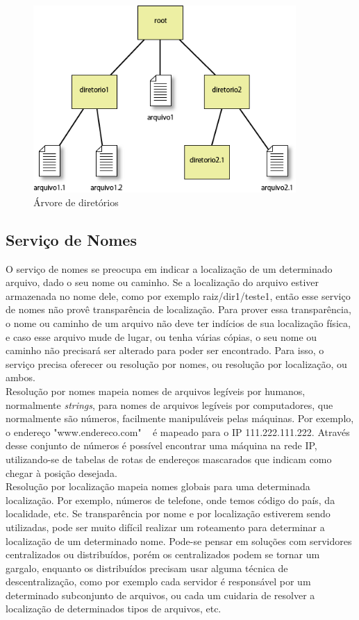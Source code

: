 	\begin{figure}[htb]
		\begin{center}
			
			\includegraphics[clip,width=10.0cm]{images/image3.png}
			\caption{Árvore de diretórios}
			\label{fig:arv_dir}
		\end{center}
	\end{figure}
	
	\subsection{Serviço de Nomes}
	O serviço de nomes se preocupa em indicar a localização de um determinado arquivo, dado o seu nome ou caminho. Se a localização do arquivo estiver armazenada no nome dele, como por exemplo raiz/dir1/teste1, então esse serviço de nomes não provê transparência de localização. Para prover essa transparência, o nome ou caminho de um arquivo não deve ter indícios de sua localização física, e caso esse arquivo mude de lugar, ou tenha várias cópias, o seu nome ou caminho não precisará
	ser alterado para poder ser encontrado. Para isso, o serviço precisa oferecer ou resolução por nomes, ou resolução por localização, ou ambos.\\
	
	Resolução por nomes mapeia nomes de arquivos legíveis por humanos, normalmente \textit{strings}, para nomes de arquivos legíveis por computadores, que normalmente são números, facilmente manipuláveis pelas máquinas. Por exemplo, o endereço "www.endereco.com" ~ é mapeado para o IP 111.222.111.222. Através desse conjunto de números é possível encontrar uma máquina na rede IP, utilizando-se de tabelas de rotas de endereços mascarados que indicam como chegar à posição desejada.\\
	
	Resolução por localização mapeia nomes globais para uma determinada localização. Por exemplo, números de telefone, onde temos código do país, da localidade, etc. Se transparência por nome e por localização estiverem sendo utilizadas, pode ser muito difícil realizar um roteamento para determinar a localização de um determinado nome. Pode-se pensar em soluções com servidores
	centralizados ou distribuídos, porém os centralizados podem se tornar um gargalo, enquanto os distribuídos precisam usar alguma técnica de descentralização, como por exemplo cada servidor é responsável por um determinado subconjunto de arquivos, ou cada um cuidaria de resolver a localização de determinados tipos de arquivos, etc.
	
